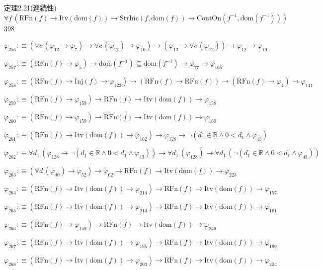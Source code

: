 \begin{fullproof}{定理2.21(連続性)}{$\forall f\,(\mathrm{RFn}(f) \to \mathrm{Itv}(\mathrm{dom}(f)) \to \mathrm{StrInc}(f,\mathrm{dom}(f)) \to \mathrm{ContOn}(f^{-1},\mathrm{dom}(f^{-1})))$}{398}
\begin{abbrevlist}
\item $\varphi_{256} :\equiv (\forall c\,(\varphi_{12} \to \varphi_{7}) \to \forall c\,(\varphi_{12}) \to \varphi_{10}) \to (\varphi_{12} \to \forall c\,(\varphi_{12})) \to \varphi_{12} \to \varphi_{10}$
\item $\varphi_{257} :\equiv (\mathrm{RFn}(f) \to \varphi_{5}) \to \mathrm{dom}(f^{-1}) \subseteq \mathrm{dom}(f^{-1}) \to \varphi_{77} \to \varphi_{165}$
\item $\varphi_{258} :\equiv (\mathrm{RFn}(f) \to \mathrm{Inj}(f) \to \varphi_{123}) \to (\mathrm{RFn}(f) \to \mathrm{RFn}(f)) \to (\mathrm{RFn}(f) \to \varphi_{4}) \to \varphi_{141}$
\item $\varphi_{259} :\equiv (\mathrm{RFn}(f) \to \varphi_{159}) \to \mathrm{RFn}(f) \to \mathrm{Itv}(\mathrm{dom}(f)) \to \varphi_{158}$
\item $\varphi_{260} :\equiv (\mathrm{RFn}(f) \to \varphi_{159}) \to \mathrm{RFn}(f) \to \mathrm{Itv}(\mathrm{dom}(f)) \to \varphi_{160}$
\item $\varphi_{261} :\equiv (\mathrm{RFn}(f) \to \mathrm{Itv}(\mathrm{dom}(f)) \to \varphi_{162}) \to \varphi_{128} \to \neg (d_{1} \in \mathbb{R} \land 0 < d_{1} \land \varphi_{43})$
\item $\varphi_{262} :\equiv \forall d_{1}\,(\varphi_{128} \to \neg (d_{1} \in \mathbb{R} \land 0 < d_{1} \land \varphi_{43})) \to \forall d_{1}\,(\varphi_{128}) \to \forall d_{1}\,(\neg (d_{1} \in \mathbb{R} \land 0 < d_{1} \land \varphi_{43}))$
\item $\varphi_{263} :\equiv (\forall d\,(\varphi_{40}) \to \varphi_{52}) \to \varphi_{62} \to \mathrm{RFn}(f) \to \mathrm{Itv}(\mathrm{dom}(f)) \to \varphi_{223}$
\item $\varphi_{264} :\equiv (\mathrm{RFn}(f) \to \mathrm{Itv}(\mathrm{dom}(f)) \to \varphi_{214}) \to \mathrm{RFn}(f) \to \mathrm{Itv}(\mathrm{dom}(f)) \to \varphi_{157}$
\item $\varphi_{265} :\equiv (\mathrm{RFn}(f) \to \mathrm{Itv}(\mathrm{dom}(f)) \to \varphi_{214}) \to \mathrm{RFn}(f) \to \mathrm{Itv}(\mathrm{dom}(f)) \to \varphi_{161}$
\item $\varphi_{266} :\equiv (\mathrm{RFn}(f) \to \varphi_{159}) \to \mathrm{RFn}(f) \to \mathrm{Itv}(\mathrm{dom}(f)) \to \varphi_{249}$
\item $\varphi_{267} :\equiv (\mathrm{RFn}(f) \to \mathrm{Itv}(\mathrm{dom}(f)) \to \varphi_{195}) \to \mathrm{RFn}(f) \to \mathrm{Itv}(\mathrm{dom}(f)) \to \varphi_{199}$
\item $\varphi_{268} :\equiv (\mathrm{RFn}(f) \to \mathrm{Itv}(\mathrm{dom}(f)) \to \varphi_{203}) \to \mathrm{RFn}(f) \to \mathrm{Itv}(\mathrm{dom}(f)) \to \varphi_{204}$

\end{abbrevlist}
\end{fullproof}
